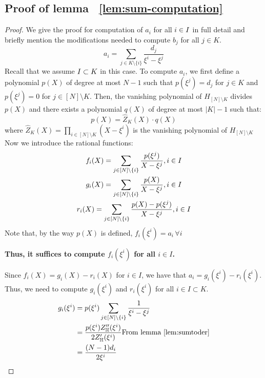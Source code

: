 \subsection{Proof of lemma ~\ref{lem:sum-computation}}\label{subsec:sum-computation}

\begin{proof}

    We give the proof for computation of $a_i$ for all $i \in I$ in full detail and briefly mention the modifications needed to compute $b_j$ for all $j \in K$. \\

    \begin{equation}\label{eq:ei}
    a_i = \sum_{j\in K\setminus \{i\}} \frac{d_j}{\xi^i - \xi^j}
    \end{equation}
    Recall that we assume $I \subset K$ in this case.
    To compute $a_i$, we first define a polynomial $p(X)$ of degree at most $N-1$ such that
    $p(\xi^j)=d_j$ for $j\in K$ and $p(\xi^j)=0$ for $j \in [N]\setminus K$.
    Then, the vanishing polynomial of $H_{[N]\setminus K}$ divides $p(X)$ and
    there exists a polynomial $q(X)$ of degree at most $|K|-1$ such that:
    \begin{equation}\label{eq:px}
    p(X) = \hat{Z}_K(X)\cdot q(X)
    \end{equation}
    where $\hat{Z}_K(X)=\prod_{i\in [N]\setminus K}(X-\xi^i)$ is the vanishing polynomial of $H_{[N]\setminus K}$\\

    Now we introduce the rational functions:
    \begin{gather}\label{eq:fgr}
    f_i(X) = \sum_{j\in [N]\setminus \{i\}}\frac{p(\xi^j)}{X-\xi^j}, i\in I \\
    g_i(X) = \sum_{j\in [N]\setminus \{i\}}\frac{p(X)}{X-\xi^j}, i\in I \\
    r_i(X) = \sum_{j\in [N]\setminus \{i\}}\frac{p(X) - p(\xi^j)}{X-\xi^j}, i\in I
    \end{gather}
    Note that, by the way $p(X)$ is defined, $f_i(\xi^i)=a_i \,\forall i$

    \textbf{Thus, it suffices to compute $f_i(\xi^i)$ for all $i \in I$.}

    Since $f_i(X) = g_i(X) - r_i(X)$ for $i\in I$, we have that
    $a_i=g_i(\xi^i)-r_i(\xi^i)$.
    Thus, we need to compute $g_i(\xi^i)$ and $r_i(\xi^i)$ for all $i \in I \subset K$.
    \begin{align*}
        g_i(\xi^i) &= p(\xi^i)\sum_{j\in [N]\setminus \{i\}} \frac{1}{\xi^i-\xi^j} \\
        &= \frac{p(\xi^i)Z_{\mathbb{H}}''(\xi^i)}{2 Z_{\mathbb{H}}'(\xi^i)} \text{From lemma \ref{lem:sumtoder}} \\
        &= \frac{(N-1)d_i}{2\xi^i}
    \end{align*}


\end{proof}
